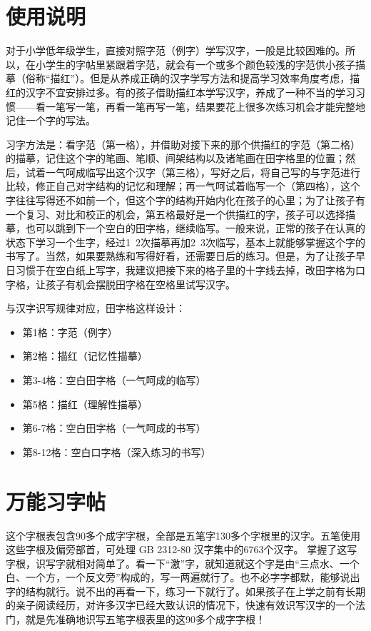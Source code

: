 \documentclass[UTF8, adobefonts, oneside]{ctexbook} \newcommand{\whzkjk}{\kaishu}
\title{\doctitle}
\begin{document}
\setlength{\parindent}{0pt}


\chapter*{使用说明}
\normalsize




对于小学低年级学生，直接对照字范（例字）学写汉字，一般是比较困难的。所以，在小学生的字帖里紧跟着字范，就会有一个或多个颜色较浅的字范供小孩子描摹（俗称“描红”）。但是从养成正确的汉字学写方法和提高学习效率角度考虑，描红的汉字不宜安排过多。有的孩子借助描红本学写汉字，养成了一种不当的学习习惯——看一笔写一笔，再看一笔再写一笔，结果要花上很多次练习机会才能完整地记住一个字的写法。


习字方法是：看字范（第一格），并借助对接下来的那个供描红的字范（第二格）的描摹，记住这个字的笔画、笔顺、间架结构以及诸笔画在田字格里的位置；然后，试着一气呵成临写出这个汉字（第三格），写好之后，将自己写的与字范进行比较，修正自己对字结构的记忆和理解；再一气呵试着临写一个（第四格），这个字往往写得还不如前一个，但这个字的结构开始内化在孩子的心里；为了让孩子有一个复习、对比和校正的机会，第五格最好是一个供描红的字，孩子可以选择描摹，也可以跳到下一个空白的田字格，继续临写。一般来说，正常的孩子在认真的状态下学习一个生字，经过1~2次描摹再加2~3次临写，基本上就能够掌握这个字的书写了。当然，如果要熟练和写得好看，还需要日后的练习。但是，为了让孩子早日习惯于在空白纸上写字，我建议把接下来的格子里的十字线去掉，改田字格为口字格，让孩子有机会摆脱田字格在空格里试写汉字。

与汉字识写规律对应，田字格这样设计：

\begin{itemize}
  \item 第1格：字范（例字）
  \item 第2格：描红（记忆性描摹）
  \item 第3-4格：空白田字格（一气呵成的临写）
  \item 第5格：描红（理解性描摹）
  \item 第6-7格：空白田字格（一气呵成的书写）
  \item 第8-12格：空白口字格（深入练习的书写）
\end{itemize}


\chapter{万能习字帖}
\normalsize

这个字根表包含90多个成字字根，全部是五笔字130多个字根里的汉字。五笔使用这些字根及偏旁部首，可处理 GB 2312-80 汉字集中的6763个汉字。
掌握了这写字根，识写字就相对简单了。看一下“激”字，就知道就这个字是由“三点水、一个白、一个方，一个反文旁”构成的，写一两遍就行了。也不必字字都默，能够说出字的结构就行。说不出的再看一下，练习一下就行了。如果孩子在上学之前有长期的亲子阅读经历，对许多汉字已经大致认识的情况下，快速有效识写汉字的一个法门，就是先准确地识写五笔字根表里的这90多个成字字根！
\end{document}
